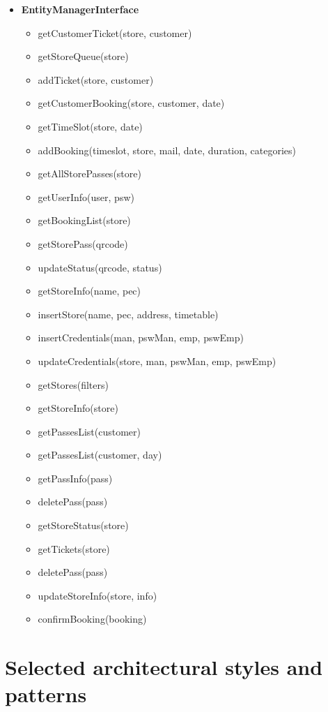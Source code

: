 \begin{itemize}
	\item \textbf{EntityManagerInterface}
	\begin{itemize}
		\item getCustomerTicket(store, customer)
		\item getStoreQueue(store)
		\item addTicket(store, customer)
		\item getCustomerBooking(store, customer, date)
		\item getTimeSlot(store, date)
		\item addBooking(timeslot, store, mail, date, duration, categories)
		\item getAllStorePasses(store)
		\item getUserInfo(user, psw)
		\item getBookingList(store)
		\item getStorePass(qrcode)
		\item updateStatus(qrcode, status)
		\item getStoreInfo(name, pec)
		\item insertStore(name, pec, address, timetable)
		\item insertCredentials(man, pswMan, emp, pswEmp)
		\item updateCredentials(store, man, pswMan, emp, pswEmp)
		\item getStores(filters)
		\item getStoreInfo(store)
		\item getPassesList(customer)
		\item getPassesList(customer, day)
		\item getPassInfo(pass)
		\item deletePass(pass)
		\item getStoreStatus(store)
		\item getTickets(store)
		\item deletePass(pass)
		\item updateStoreInfo(store, info)
		\item confirmBooking(booking)
	\end{itemize}
\end{itemize}

\clearpage

\section{Selected architectural styles and patterns}

